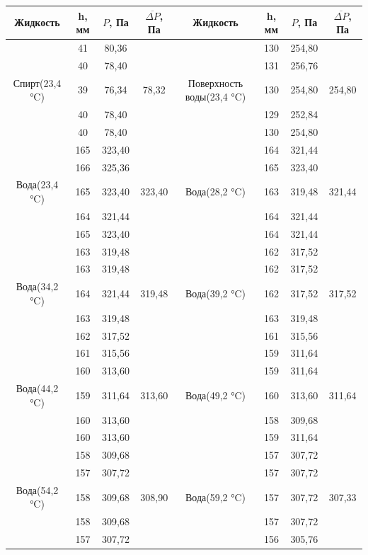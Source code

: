 \documentclass[a4paper, 12pt]{article}
\begin{document}
		\begin{longtable}[H]{|c|c|c|c||c|c|c|c|}
			\hline
			Жидкость & h, мм & $P$, Па & $\overline{\Delta P}$, Па & Жидкость & h, мм & $P$, Па & $\overline{\Delta P}$, Па \\
			\hline
			& 41 & 80,36 & &  & 130 & 254,80 & \\
			& 40 & 78,40 & &  & 131 & 256,76 & \\
			Спирт(23,4 °C) & 39 & 76,34 & 78,32 & Поверхность воды(23,4 °C) & 130 & 254,80 & 254,80 \\
			& 40 & 78,40 & &  & 129 & 252,84 & \\
			& 40 & 78,40 & &  & 130 & 254,80 & \\
			\hline
			& 165 & 323,40 & &  & 164 & 321,44 & \\
			& 166 & 325,36 & &  & 165 & 323,40 & \\
			Вода(23,4 °C) & 165 & 323,40 & 323,40 & Вода(28,2 °C) & 163 & 319,48 & 321,44\\
			& 164 & 321,44 & &  & 164 & 321,44 & \\
			& 165 & 323,40 & &  & 164 & 321,44 & \\
			\hline
			& 163 & 319,48 & &  & 162 & 317,52 & \\
			& 163 & 319,48 & &  & 162 & 317,52 & \\
			Вода(34,2 °C) & 164 & 321,44 & 319,48 & Вода(39,2 °C) & 162 & 317,52 & 317,52\\
			& 163 & 319,48 & &  & 163 & 319,48 & \\
			& 162 & 317,52 & &  & 161 & 315,56 & \\
			\hline
			& 161 & 315,56 & &  & 159 & 311,64 & \\
			& 160 & 313,60 & &  & 159 & 311,64 & \\
			Вода(44,2 °C) & 159 & 311,64 & 313,60 & Вода(49,2 °C) & 160 & 313,60 & 311,64 \\
			& 160 & 313,60 & &  & 158 & 309,68 & \\
			& 160 & 313,60 & &  & 159 & 311,64 & \\
			\hline
			& 158 & 309,68 & &  & 157 & 307,72 & \\
			& 157 & 307,72 & &  & 157 & 307,72 & \\
			Вода(54,2 °C) & 158 & 309,68 & 308,90 & Вода(59,2 °C) & 157 & 307,72 & 307,33 \\
			& 158 & 309,68 & &  & 157 & 307,72 & \\
			& 157 & 307,72 & &  & 156 & 305,76 & \\
			\hline
		\end{longtable}
\end{document}
